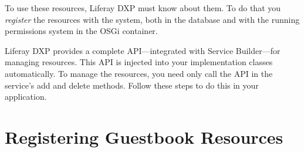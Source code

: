 To use these resources, Liferay DXP must know about them. To do that you
\emph{register} the resources with the system, both in the database and
with the running permissions system in the OSGi container.

Liferay DXP provides a complete API---integrated with Service
Builder---for managing resources. This API is injected into your
implementation classes automatically. To manage the resources, you need
only call the API in the service's add and delete methods. Follow these
steps to do this in your application.

\section{Registering Guestbook
Resources}\label{registering-guestbook-resources}

